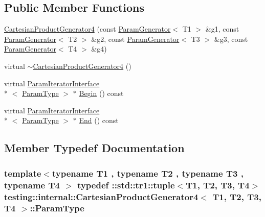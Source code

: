 \subsection*{Public Member Functions}
\begin{DoxyCompactItemize}
\item 
\hyperlink{classtesting_1_1internal_1_1_cartesian_product_generator4_a4e4512b35f0d71f7a718ded6fe829296}{Cartesian\-Product\-Generator4} (const \hyperlink{classtesting_1_1internal_1_1_param_generator}{Param\-Generator}$<$ T1 $>$ \&g1, const \hyperlink{classtesting_1_1internal_1_1_param_generator}{Param\-Generator}$<$ T2 $>$ \&g2, const \hyperlink{classtesting_1_1internal_1_1_param_generator}{Param\-Generator}$<$ T3 $>$ \&g3, const \hyperlink{classtesting_1_1internal_1_1_param_generator}{Param\-Generator}$<$ T4 $>$ \&g4)
\item 
virtual \hyperlink{classtesting_1_1internal_1_1_cartesian_product_generator4_a696ae3766915960d69b7b3d017bc2c92}{$\sim$\-Cartesian\-Product\-Generator4} ()
\item 
virtual \hyperlink{classtesting_1_1internal_1_1_param_iterator_interface}{Param\-Iterator\-Interface}\\*
$<$ \hyperlink{classtesting_1_1internal_1_1_cartesian_product_generator4_ac8cc31e9f7b2d0b7ee725a60f82edb78}{Param\-Type} $>$ $\ast$ \hyperlink{classtesting_1_1internal_1_1_cartesian_product_generator4_ac7657bf31f1b806075d672fccb6afbd1}{Begin} () const 
\item 
virtual \hyperlink{classtesting_1_1internal_1_1_param_iterator_interface}{Param\-Iterator\-Interface}\\*
$<$ \hyperlink{classtesting_1_1internal_1_1_cartesian_product_generator4_ac8cc31e9f7b2d0b7ee725a60f82edb78}{Param\-Type} $>$ $\ast$ \hyperlink{classtesting_1_1internal_1_1_cartesian_product_generator4_ae754e777c3d8f93578d32af2721d069b}{End} () const 
\end{DoxyCompactItemize}


\subsection{Member Typedef Documentation}
\hypertarget{classtesting_1_1internal_1_1_cartesian_product_generator4_ac8cc31e9f7b2d0b7ee725a60f82edb78}{
\subsubsection[{Param\-Type}]{\setlength{\rightskip}{0pt plus 5cm}template$<$typename T1 , typename T2 , typename T3 , typename T4 $>$ typedef \-::{\bf std\-::tr1\-::tuple}$<$T1, T2, T3, T4$>$ {\bf testing\-::internal\-::\-Cartesian\-Product\-Generator4}$<$ T1, T2, T3, T4 $>$\-::{\bf Param\-Type}}}\label{classtesting_1_1internal_1_1_cartesian_product_generator4_ac8cc31e9f7b2d0b7ee725a60f82edb78}


